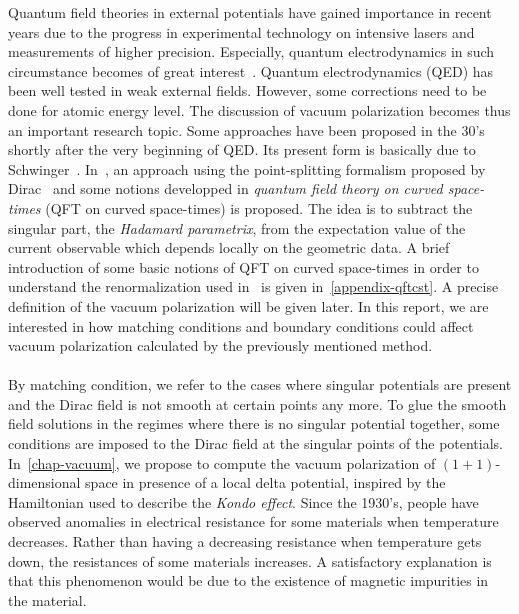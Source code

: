 Quantum field theories in external potentials have gained importance in recent years due to the progress in experimental technology on intensive lasers and measurements of higher precision.
Especially, quantum electrodynamics in such circumstance becomes of great interest~\cite{Mohr1998}. 
Quantum electrodynamics (QED) has been well tested in weak external fields.
However, some corrections need to be done for atomic energy level. 
The discussion of vacuum polarization becomes thus an important research topic. 
Some approaches have been proposed in the 30's shortly after the very beginning of QED.
Its present form is basically due to Schwinger~\cite{Schwinger1951}. 
In~\cite{Zahn2015}, an approach using the point-splitting formalism proposed by Dirac~\cite{Dirac1934} and some notions developped in \textit{quantum field theory on curved space-times} (QFT on curved space-times) is proposed. 
The idea is to subtract the singular part, the \textit{Hadamard parametrix}, from the expectation value of the current observable which depends locally on the geometric data. 
A brief introduction of some basic notions of QFT on curved space-times in order to understand the renormalization used in~\cite{Zahn2015} is given in~\cref{appendix-qftcst}.
A precise definition of the vacuum polarization will be given later.
In this report, we are interested in how matching conditions and boundary conditions could affect vacuum polarization calculated by the previously mentioned method. \\\\
%
By matching condition, we refer to the cases where singular potentials are present and the Dirac field is not smooth at certain points any more. 
To glue the smooth field solutions in the regimes where there is no singular potential together, 
some conditions are imposed to the Dirac field at the singular points of the potentials.
In~\cref{chap-vacuum}, we propose to compute the vacuum polarization of 
$(1+1)$-dimensional space in presence of a local delta potential, inspired by the Hamiltonian used to describe the \textit{Kondo effect}.
Since the 1930's, people have observed anomalies in electrical resistance for some materials when temperature decreases. 
Rather than having a decreasing resistance when temperature gets down,
the resistances of some materials increases. 
A satisfactory explanation is that this phenomenon would be due to the existence of magnetic impurities in the material. 
